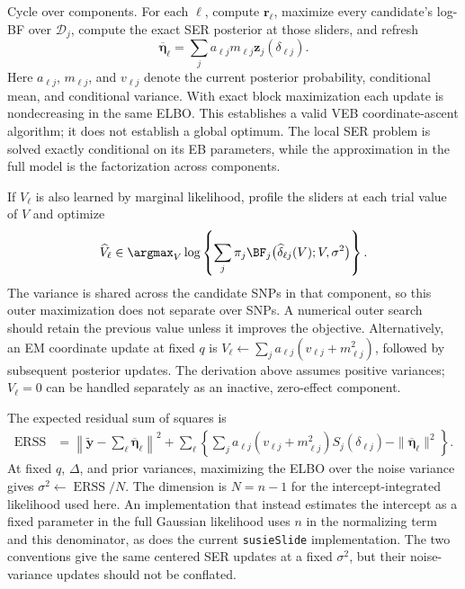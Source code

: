 Cycle over components. For each $\ell$, compute
$\mathbf r_\ell$, maximize every candidate's log-BF over
$\mathcal D_j$, compute the exact SER posterior at those sliders,
and refresh
\begin{equation}
\overline{\boldsymbol\eta}_\ell
 =\sum_j a_{\ell j}m_{\ell j}
              \mathbf z_j(\delta_{\ell j}).
\label{eq:veb-component-mean}
\end{equation}
Here $a_{\ell j}$, $m_{\ell j}$, and $v_{\ell j}$ denote the
current posterior probability, conditional mean, and conditional
variance. With exact block maximization each update is
nondecreasing in the same ELBO. This establishes a valid VEB
coordinate-ascent algorithm; it does not establish a global optimum.
The local SER problem is solved exactly conditional on its EB
parameters, while the approximation in the full model is the
factorization across components.

If $V_\ell$ is also learned by marginal likelihood, profile the
sliders at each trial value of $V$ and optimize
\begin{equation}
\widehat V_\ell\in\argmax_V
 \log\left\{\sum_j\pi_j
  \BF_j\bigl(\widehat\delta_{\ell j}(V);V,\sigma^2\bigr)\right\}.
\label{eq:veb-profile-prior-variance}
\end{equation}
The variance is shared across the candidate SNPs in that component,
so this outer maximization does not separate over SNPs. A numerical
outer search should retain the previous value unless it improves
the objective. Alternatively, an EM coordinate update at fixed
$q$ is $V_\ell\leftarrow\sum_j a_{\ell j}(v_{\ell j}+m_{\ell j}^2)$,
followed by subsequent posterior updates. The derivation above
assumes positive variances; $V_\ell=0$ can be handled separately
as an inactive, zero-effect component.

The expected residual sum of squares is
\begin{align}
\operatorname{ERSS}
 &=\left\|\widetilde{\mathbf y}
        -\sum_\ell\overline{\boldsymbol\eta}_\ell\right\|^2
   +\sum_\ell\left\{
      \sum_j a_{\ell j}(v_{\ell j}+m_{\ell j}^2)
                    S_j(\delta_{\ell j})
      -\|\overline{\boldsymbol\eta}_\ell\|^2\right\}.
\label{eq:veb-erss}
\end{align}
At fixed $q$, $\Delta$, and prior variances, maximizing the ELBO
over the noise variance gives $\sigma^2\leftarrow\operatorname{ERSS}/N$.
The dimension is $N=n-1$ for the intercept-integrated likelihood used
here. An implementation that instead estimates the intercept as a
fixed parameter in the full Gaussian likelihood uses $n$ in the
normalizing term and this denominator, as does the current
\texttt{susieSlide} implementation. The two conventions give the
same centered SER updates at a fixed $\sigma^2$, but their
noise-variance updates should not be conflated.

